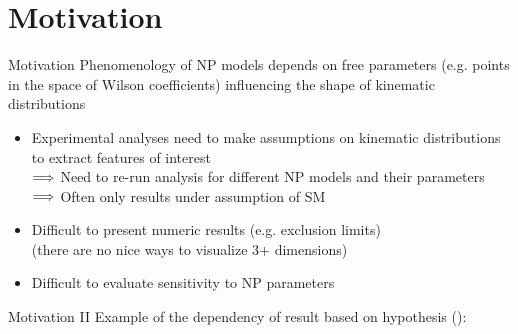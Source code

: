 \section{Motivation}
\begin{frame}{Motivation}
	Phenomenology of NP models depends on free parameters (e.g. points in the space of Wilson coefficients) influencing the shape of kinematic distributions
	
	\bigskip
	\begin{itemize}
		\item Experimental analyses need to make assumptions on kinematic distributions to extract features of interest\\
		$\Longrightarrow$ Need to re-run analysis for different NP models and their parameters\\
		$\Longrightarrow$ Often only results under assumption of SM 
		\item Difficult to present numeric results (e.g. exclusion limits)\\
		{\footnotesize (there are no nice ways to visualize 3+ dimensions)}\\
		\item Difficult to evaluate sensitivity to NP parameters
	\end{itemize}
\end{frame}
%
\begin{frame}{Motivation II}
	Example of the dependency of result based on hypothesis ():\\
			
	\medskip
	\begin{center}
	\end{center}
\end{frame}
